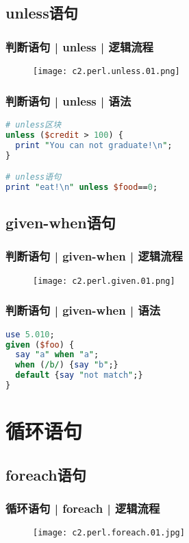\subsection{unless语句}
\begin{frame}
  \frametitle{判断语句 | unless | 逻辑流程}
  \begin{figure}
    \centering
    \texttt{[image: c2.perl.unless.01.png]}
  \end{figure}
\end{frame}

\begin{frame}[fragile]
  \frametitle{判断语句 | unless | \alert{语法}}
\begin{lstlisting}[language=Perl]
# unless区块
unless ($credit > 100) {
  print "You can not graduate!\n";
}

# unless语句
print "eat!\n" unless $food==0;
\end{lstlisting}
\end{frame}

\subsection{given-when语句}
\begin{frame}
  \frametitle{判断语句 | given-when | 逻辑流程}
  \begin{figure}
    \centering
    \texttt{[image: c2.perl.given.01.png]}
  \end{figure}
\end{frame}

\begin{frame}[fragile]
  \frametitle{判断语句 | given-when | 语法}
\begin{lstlisting}[language=Perl]
use 5.010;
given ($foo) {
  say "a" when "a";
  when (/b/) {say "b";}
  default {say "not match";}
}
\end{lstlisting}
\end{frame}

\section{循环语句}
\subsection{foreach语句}
\begin{frame}
  \frametitle{循环语句 | foreach | 逻辑流程}
  \begin{figure}
    \centering
    \texttt{[image: c2.perl.foreach.01.jpg]}
  \end{figure}
\end{frame}

